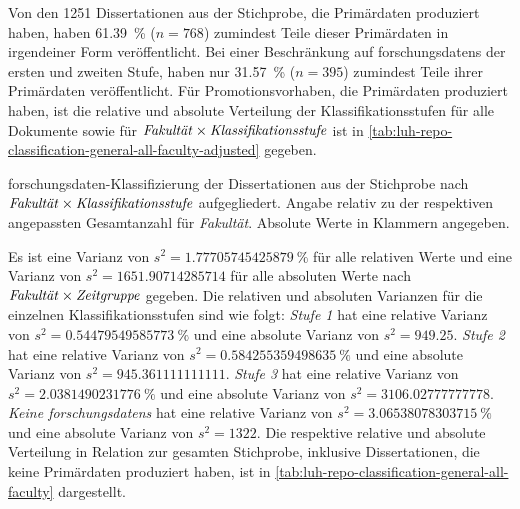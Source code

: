 Von den \num{1251} Dissertationen aus der Stichprobe, die Primärdaten produziert haben, haben \SI{61,39}{\percent} ($n=\num{768}$) zumindest Teile dieser Primärdaten in irgendeiner Form veröffentlicht.
Bei einer Beschränkung auf \glspl{forschungsdaten} der ersten und zweiten Stufe, haben nur \SI{31,57}{\percent} ($n=\num{395}$) zumindest Teile ihrer Primärdaten veröffentlicht.
Für Promotionsvorhaben, die Primärdaten produziert haben, ist die relative und absolute Verteilung der Klassifikationsstufen für alle Dokumente sowie für $\text{\textit{Fakultät}}\times\text{\textit{Klassifikationsstufe}}$ ist in \cref{tab:luh-repo-classification-general-all-faculty-adjusted} gegeben.
\begin{table}[!htbp]
	\caption{\gls{forschungsdaten}-Klassifizierung der Dissertationen aus der Stichprobe nach $\text{\textit{Fakultät}}\times\text{\textit{Klassifikationsstufe}}$ aufgegliedert.
    Angabe relativ zu der respektiven angepassten Gesamtanzahl für \textit{Fakultät}.
    Absolute Werte in Klammern angegeben.}
    
    \label{tab:luh-repo-classification-general-all-faculty-adjusted}
\end{table}
Es ist eine Varianz von $s^2=\SI[round-mode=places,round-precision=3]{1.77705745425879}{\percent}$ für alle relativen Werte und eine Varianz von $s^2=\num[round-mode=places,round-precision=3]{1651.90714285714}$ für alle absoluten Werte nach $\text{\textit{Fakultät}}\times\text{\textit{Zeitgruppe}}$ gegeben.
Die relativen und absoluten Varianzen für die einzelnen Klassifikationsstufen sind wie folgt:
\textit{Stufe 1} hat eine relative Varianz von $s^2=\SI[round-mode=places,round-precision=3]{0.54479549585773}{\percent}$ und eine absolute Varianz von $s^2=\num[round-mode=places,round-precision=3]{949.25}$.
\textit{Stufe 2} hat eine relative Varianz von $s^2=\SI[round-mode=places,round-precision=3]{0.584255359498635}{\percent}$ und eine absolute Varianz von $s^2=\num[round-mode=places,round-precision=3]{945.361111111111}$.
\textit{Stufe 3} hat eine relative Varianz von $s^2=\SI[round-mode=places,round-precision=3]{2.0381490231776}{\percent}$ und eine absolute Varianz von $s^2=\num[round-mode=places,round-precision=3]{3106.02777777778}$.
\textit{Keine \glspl{forschungsdaten}} hat eine relative Varianz von $s^2=\SI[round-mode=places,round-precision=3]{3.06538078303715}{\percent}$ und eine absolute Varianz von $s^2=\num[round-mode=places,round-precision=3]{1322}$.
Die respektive relative und absolute Verteilung in Relation zur gesamten Stichprobe, inklusive Dissertationen, die keine Primärdaten produziert haben, ist in \cref{tab:luh-repo-classification-general-all-faculty} dargestellt.
